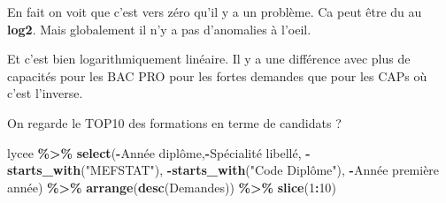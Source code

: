 \documentclass[
]{book}
\newenvironment{Shaded}{\begin{snugshade}}{\end{snugshade}}
\newcommand{\AttributeTok}[1]{\textcolor[rgb]{0.13,0.29,0.53}{#1}}
\newcommand{\DecValTok}[1]{\textcolor[rgb]{0.00,0.00,0.81}{#1}}
\newcommand{\FunctionTok}[1]{\textcolor[rgb]{0.13,0.29,0.53}{\textbf{#1}}}
\newcommand{\NormalTok}[1]{#1}
\newcommand{\SpecialCharTok}[1]{\textcolor[rgb]{0.81,0.36,0.00}{\textbf{#1}}}
\newcommand{\StringTok}[1]{\textcolor[rgb]{0.31,0.60,0.02}{#1}}
\begin{document}
En fait on voit que c'est vers zéro qu'il y a un problème. Ca peut être du au \textbf{log2}.
Mais globalement il n'y a pas d'anomalies à l'oeil.

Et c'est bien logarithmiquement linéaire. Il y a une différence avec plus de capacités
pour les BAC PRO pour les fortes demandes que pour les CAPs où c'est l'inverse.

On regarde le TOP10 des formations en terme de candidats ?

\begin{Shaded}
\begin{Highlighting}[]
\NormalTok{lycee }\SpecialCharTok{\%\textgreater{}\%} \FunctionTok{select}\NormalTok{(}\SpecialCharTok{{-}}\StringTok{\textasciigrave{}}\AttributeTok{Année diplôme}\StringTok{\textasciigrave{}}\NormalTok{,}\SpecialCharTok{{-}}\StringTok{\textasciigrave{}}\AttributeTok{Spécialité libellé}\StringTok{\textasciigrave{}}\NormalTok{,}
                 \SpecialCharTok{{-}}\FunctionTok{starts\_with}\NormalTok{(}\StringTok{"MEFSTAT"}\NormalTok{),}
                 \SpecialCharTok{{-}}\FunctionTok{starts\_with}\NormalTok{(}\StringTok{"Code Diplôme"}\NormalTok{),}
                 \SpecialCharTok{{-}}\StringTok{\textasciigrave{}}\AttributeTok{Année première année}\StringTok{\textasciigrave{}}\NormalTok{) }\SpecialCharTok{\%\textgreater{}\%} \FunctionTok{arrange}\NormalTok{(}\FunctionTok{desc}\NormalTok{(Demandes)) }\SpecialCharTok{\%\textgreater{}\%}
  \FunctionTok{slice}\NormalTok{(}\DecValTok{1}\SpecialCharTok{:}\DecValTok{10}\NormalTok{)}
\end{Highlighting}
\end{Shaded}
\end{document}
